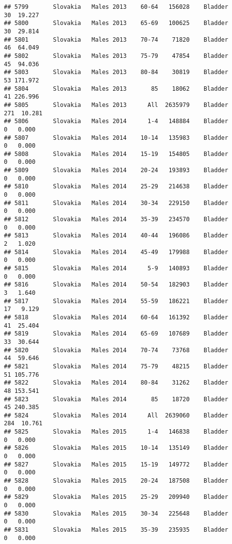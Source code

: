 \documentclass[
]{article}
\begin{document}
\begin{verbatim}
## 5799       Slovakia   Males 2013    60-64   156028    Bladder     30  19.227
## 5800       Slovakia   Males 2013    65-69   100625    Bladder     30  29.814
## 5801       Slovakia   Males 2013    70-74    71820    Bladder     46  64.049
## 5802       Slovakia   Males 2013    75-79    47854    Bladder     45  94.036
## 5803       Slovakia   Males 2013    80-84    30819    Bladder     53 171.972
## 5804       Slovakia   Males 2013       85    18062    Bladder     41 226.996
## 5805       Slovakia   Males 2013      All  2635979    Bladder    271  10.281
## 5806       Slovakia   Males 2014      1-4   148884    Bladder      0   0.000
## 5807       Slovakia   Males 2014    10-14   135983    Bladder      0   0.000
## 5808       Slovakia   Males 2014    15-19   154805    Bladder      0   0.000
## 5809       Slovakia   Males 2014    20-24   193893    Bladder      0   0.000
## 5810       Slovakia   Males 2014    25-29   214638    Bladder      0   0.000
## 5811       Slovakia   Males 2014    30-34   229150    Bladder      0   0.000
## 5812       Slovakia   Males 2014    35-39   234570    Bladder      0   0.000
## 5813       Slovakia   Males 2014    40-44   196086    Bladder      2   1.020
## 5814       Slovakia   Males 2014    45-49   179988    Bladder      0   0.000
## 5815       Slovakia   Males 2014      5-9   140893    Bladder      0   0.000
## 5816       Slovakia   Males 2014    50-54   182903    Bladder      3   1.640
## 5817       Slovakia   Males 2014    55-59   186221    Bladder     17   9.129
## 5818       Slovakia   Males 2014    60-64   161392    Bladder     41  25.404
## 5819       Slovakia   Males 2014    65-69   107689    Bladder     33  30.644
## 5820       Slovakia   Males 2014    70-74    73768    Bladder     44  59.646
## 5821       Slovakia   Males 2014    75-79    48215    Bladder     51 105.776
## 5822       Slovakia   Males 2014    80-84    31262    Bladder     48 153.541
## 5823       Slovakia   Males 2014       85    18720    Bladder     45 240.385
## 5824       Slovakia   Males 2014      All  2639060    Bladder    284  10.761
## 5825       Slovakia   Males 2015      1-4   146838    Bladder      0   0.000
## 5826       Slovakia   Males 2015    10-14   135149    Bladder      0   0.000
## 5827       Slovakia   Males 2015    15-19   149772    Bladder      0   0.000
## 5828       Slovakia   Males 2015    20-24   187508    Bladder      0   0.000
## 5829       Slovakia   Males 2015    25-29   209940    Bladder      0   0.000
## 5830       Slovakia   Males 2015    30-34   225648    Bladder      0   0.000
## 5831       Slovakia   Males 2015    35-39   235935    Bladder      0   0.000

\end{verbatim}
\end{document}
